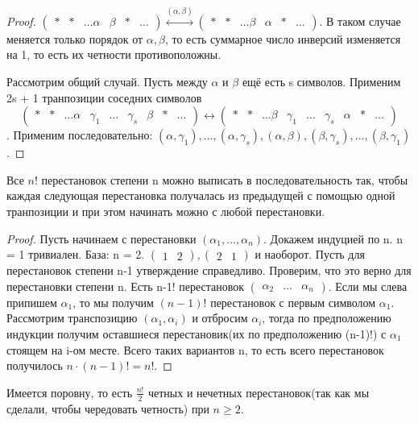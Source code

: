 \begin{proof}
	\(\begin{pmatrix}
		* & * & \ldots \alpha & \beta & * & \ldots
	\end{pmatrix} \overset{(\alpha, \beta)}{\longleftrightarrow}
	\begin{pmatrix}
		* & * & \ldots \beta & \alpha & * & \ldots
	\end{pmatrix}\). В таком случае меняется только порядок от $\alpha, \beta$, то есть суммарное число инверсий изменяется на 1, то есть их четности противоположны. 
	
	Рассмотрим общий случай. Пусть между $\alpha$ и $\beta$ ещё есть s символов. Применим 2s + 1 транпозиции соседних символов \[\begin{pmatrix}
	* & * & \ldots \alpha & \gamma_1 & \ldots & \gamma_s & \beta & * & \ldots
	\end{pmatrix} \longleftrightarrow \begin{pmatrix}
	* & * & \ldots \beta & \gamma_1 & \ldots & \gamma_s & \alpha & * & \ldots
	\end{pmatrix}\]. 
	Применим последовательно: \((\alpha, \gamma_1), \ldots, (\alpha, \gamma_s), (\alpha, \beta), (\beta, \gamma_s), \ldots, (\beta, \gamma_1)\).
\end{proof}
\begin{proposition}
	Все \(n!\) перестановок степени n можно выписать в последовательность так, чтобы каждая следующая перестановка получалась из предыдущей с помощью одной транпозиции и при этом начинать можно с любой перестановки.
\end{proposition}
\begin{proof}
	Пусть начинаем с перестановки \((\alpha_1, \ldots, \alpha_n)\). Докажем индуцией по n. n = 1 тривиален. База: n = 2. \(\begin{pmatrix}
	1 & 2
	\end{pmatrix}, \begin{pmatrix}
	2 & 1
	\end{pmatrix}\) и наоборот. Пусть для перестановок степени n-1 утверждение справедливо. Проверим, что это верно для перестановки степени n. Есть n-1! перестановок \(\begin{pmatrix}
	\alpha_2 & \ldots & \alpha_n
\end{pmatrix}\). Если мы слева припишем $\alpha_1$, то мы получим \((n-1)!\) перестановок с первым символом \(\alpha_1\). Рассмотрим транспозицию \((\alpha_1, \alpha_i)\) и отбросим $\alpha_i$, тогда по предположению индукции получим оставшиеся перестановик(их по предположению (n-1)!) с $\alpha_1$ стоящем на i-ом месте. Всего таких вариантов n, то есть всего перестановок получилось \(n\cdot(n-1)! = n!\).
\end{proof}
\begin{corollary}
	Имеется поровну, то есть \(\frac{n!}{2}\) четных и нечетных перестановок(так как мы сделали, чтобы чередовать четность) при \(n\ge 2\).
\end{corollary}

